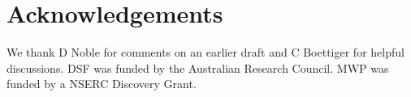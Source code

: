 \documentclass[a4paper,11pt]{article}
\begin{document}
%





\section{Acknowledgements}
We thank D Noble for comments on an earlier draft and C Boettiger  for helpful discussions. DSF was funded by the Australian Research Council. MWP was funded by a NSERC Discovery Grant.
\end{document}
